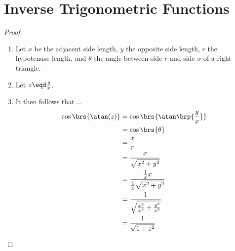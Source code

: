 \section{Inverse Trigonometric Functions}
\begin{theorem}
\label{thm:trig_inverse}
\end{theorem}
\begin{proof}
\begin{enumerate}
  \item Let $x$ be the adjacent side length, $y$ the opposite side length, $r$ the hypotenuse length,
        and $\theta$ the angle between side $r$ and side $x$
        of a right triangle.
  \item Let $z\eqd\frac{y}{x}$.
  \item It then follows that \ldots
    \begin{align*}
      \cos\brs{\atan(z)}
        &= \cos\brs{\atan\brp{\frac{y}{x}}}
      \\&= \cos\brs{\theta}
      \\&= \frac{ x }
                { r }
      \\&= \frac{ x              }
                { \sqrt{x^2+y^2} }
      \\&= \frac{ \frac{1}{x} x              }
                { \frac{1}{x} \sqrt{x^2+y^2} }
      \\&= \frac{ 1}
                { \sqrt{\frac{x^2}{x^2}+\frac{y^2}{x^2}}}
      \\&= \frac{ 1}
                { \sqrt{1+z^2} }
    \end{align*}
\end{enumerate}
\end{proof}

